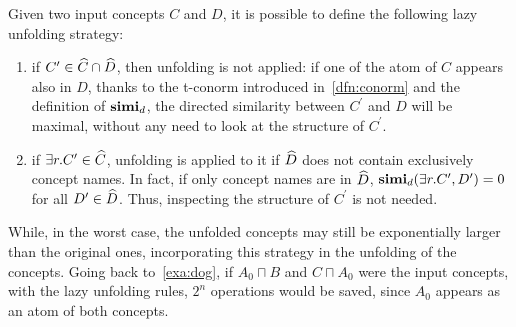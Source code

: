  Given two input concepts \(C\) and \(D\), it is possible to define the following lazy unfolding strategy:
  \begin{enumerate}
    \item if \(C^\prime \in \widehat{C} \cap \widehat{D}\), then unfolding is not applied: if one of the atom of \(C\) appears also in \(D\), thanks to the t-conorm introduced in~\cref{dfn:conorm} and the definition of \(\mathbf{simi}_d\), the directed similarity between \(C^\prime\) and \(D\) will be maximal, without any need to look at the structure of \(C^\prime\).
    \item if \(\exists{}r.C^\prime \in \widehat{C}\), unfolding is applied to it if \(\widehat{D}\) does not contain exclusively concept names. In fact, if only concept names are in \(\widehat{D}\), \(\mathbf{simi}_d(\exists{}r.C^\prime,D^\prime) = 0\) for all \(D^\prime \in \widehat{D}\).
    Thus, inspecting the structure of \(C^\prime\) is not needed. 
  \end{enumerate}
  
  While, in the worst case, the unfolded concepts may still be exponentially larger than the original ones, incorporating this strategy in the unfolding of the concepts.
  Going back to~\cref{exa:dog}, if \(A_0 \sqcap B\) and \(C \sqcap A_0\) were the input concepts, with the lazy unfolding rules, \(2^n\) operations would be saved, since \(A_0\) appears as an atom of both concepts.
  
  